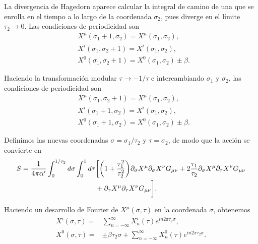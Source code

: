 La divergencia de Hagedorn aparece calcular la integral de camino de una que se enrolla en el tiempo 
a lo largo de la coordenada  $\sigma_2$, pues diverge en el límite $\tau_2\to0$.
Las condiciones de periodicidad son
\begin{equation}
  \begin{aligned}
    &X^\mu(\sigma_1+1,\sigma_2)=X^\mu(\sigma_1,\sigma_2),\\
    &X^i(\sigma_1,\sigma_2+1)=X^i(\sigma_1,\sigma_2),\\
    &X^0(\sigma_1,\sigma_2+1) = X^0(\sigma_1,\sigma_2)\pm \beta.
  \end{aligned}
\end{equation}

Haciendo la transformación modular $\tau\to-1/\tau$ e intercambiando $\sigma_1$ y $\sigma_2$, las
condiciones de periodicidad son
\begin{equation}
  \begin{aligned}
    &X^\mu(\sigma_1,\sigma_2+1)=X^\mu(\sigma_1,\sigma_2),\\
    &X^i(\sigma_1+1,\sigma_2)=X^i(\sigma_1,\sigma_2),\\
    &X^0(\sigma_1+1,\sigma_2) = X^0(\sigma_1,\sigma_2)\pm \beta.
  \end{aligned}
\end{equation}

Definimos las nuevas coordenadas $\sigma=\sigma_1/\tau_2$ y $\tau=\sigma_2$, de modo 
que la acción se convierte en 
\begin{equation}
  \begin{aligned}
    S= \frac{1}{4\pi \alpha'}\int_0^{1/\tau_2} d\sigma  \int_0^1 d\tau 
    &\biggl[
      \qty(1+\frac{\tau_1^2}{\tau^2_2})\partial_\sigma X^\mu \partial_\sigma X^\nu G_{\mu\nu} +
      2\frac{\tau_1}{\tau_2}\partial_\sigma X^\mu \partial_\tau X^\nu G_{\mu\nu}  \\
      &+ \partial_\tau X^\mu \partial_\tau X^\nu G_{\mu\nu}\biggl].
  \end{aligned}
\end{equation}


Haciendo un desarrollo de Fourier de $X^\mu(\sigma,\tau)$ en la coordenada $\sigma$, obtenemos
\begin{equation}
  \begin{aligned}
    X^i(\sigma,\tau) =& \sum_{n=-\infty}^\infty X_n^i(\tau) e^{in2\pi \tau_2 \sigma}, \\
    X^0(\sigma,\tau) =& \pm \beta \tau_2 \sigma +  \sum_{n=-\infty}^\infty X_n^0(\tau) e^{in2\pi \tau_2 \sigma}.
    \label{eq:four}
  \end{aligned}
\end{equation}

